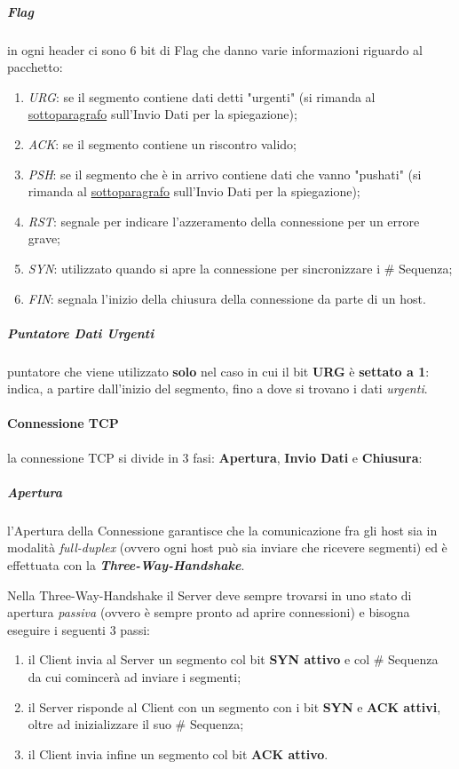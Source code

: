 \documentclass[a4paper]{article}
\begin{document}
					\subparagraph{Flag}
						in ogni header ci sono 6 bit di Flag che danno varie informazioni riguardo al pacchetto:
						\begin{enumerate}
							\item \emph{URG}: se il segmento contiene dati detti "urgenti" (si rimanda al \hyperref[par:invioDati]{sottoparagrafo} sull'Invio Dati per la spiegazione);
							\item \emph{ACK}: se il segmento contiene un riscontro valido;
							\item \emph{PSH}: se il segmento che è in arrivo contiene dati che vanno "pushati" (si rimanda al \hyperref[par:invioDati]{sottoparagrafo} sull'Invio Dati per la spiegazione);
							\item \emph{RST}: segnale per indicare l'azzeramento della connessione per un errore grave;
							\item \emph{SYN}: utilizzato quando si apre la connessione per sincronizzare i \# Sequenza;
							\item \emph{FIN}: segnala l'inizio della chiusura della connessione da parte di un host.
						\end{enumerate}
				
					\subparagraph{Puntatore Dati Urgenti}
					\label{par:pointerUrg}
						puntatore che viene utilizzato \textbf{solo} nel caso in cui il bit \textbf{URG} è \textbf{settato a 1}: indica, a partire dall'inizio del segmento, fino a dove si trovano i dati \emph{urgenti}.
						
				\paragraph{Connessione TCP}
					la connessione TCP si divide in 3 fasi: \textbf{Apertura}, \textbf{Invio Dati} e \textbf{Chiusura}:
					
					\subparagraph{Apertura}
					\label{par:apertura}
						l'Apertura della Connessione garantisce che la comunicazione fra gli host sia in modalità \emph{full-duplex} (ovvero ogni host può sia inviare che ricevere segmenti) ed è effettuata con la \textbf{\emph{Three-Way-Handshake}}.
						
						Nella Three-Way-Handshake il Server deve sempre trovarsi in uno stato di apertura \emph{passiva} (ovvero è sempre pronto ad aprire connessioni) e bisogna eseguire i seguenti 3 passi:
						\begin{enumerate}
							\item il Client invia al Server un segmento col bit \textbf{SYN attivo} e col \# Sequenza da cui comincerà ad inviare i segmenti;
							\item il Server risponde al Client con un segmento con i bit \textbf{SYN} e \textbf{ACK attivi}, oltre ad inizializzare il suo \# Sequenza;
							\item il Client invia infine un segmento col bit \textbf{ACK attivo}.
						\end{enumerate}
						
\end{document}
